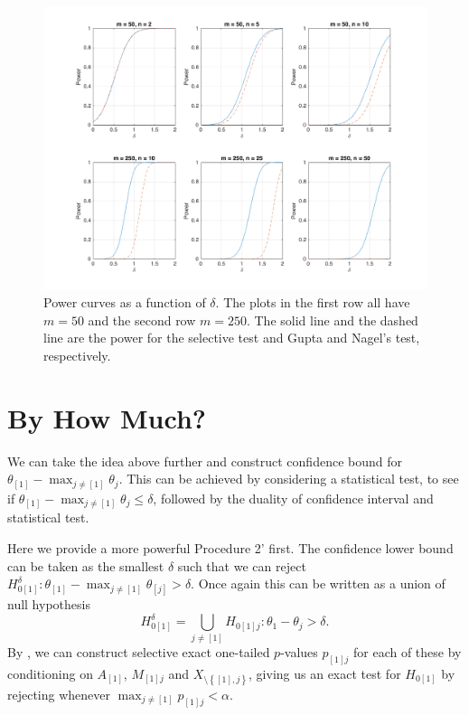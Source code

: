 \documentclass[11pt]{article}
\begin{document}
\begin{figure}[htbp]
\begin{center}
\includegraphics[width = \textwidth]{plotMultinomialPower}
\end{center}
\caption{Power curves as a function of $\delta$. The plots in the first row all have $m = 50$ and the second row $m = 250$. The solid line and the dashed line are the power for the selective test and Gupta and Nagel's test, respectively.}
\label{fig:power}
\end{figure}

\section{By How Much?}
\label{sec:confbound}

We can take the idea above further and construct confidence bound for $\theta_{[1]} - \max_{j \ne [1]} \theta_{j}$. This can be achieved by considering a statistical test, to see if $\theta_{[1]} - \max_{j \ne [1]} \theta_{j} \le \delta$, followed by the duality of confidence interval and statistical test.

Here we provide a more powerful Procedure 2' first. The confidence lower bound can be taken as the smallest $\delta$ such that we can reject $H_{0[1]}^\delta: \theta_{[1]} - \max_{j \ne [1]} \theta_{[j]} > \delta$. Once again this can be written as a union of null hypothesis
$$H_{0[1]}^\delta = \bigcup_{j \ne [1]} H_{0[1]j}: \theta_1 - \theta_j > \delta.$$
By , we can construct selective exact one-tailed $p$-values $p_{[1]j}$ for each of these by conditioning on $A_{[1]}$, $M_{[1]j}$ and $X_{\setminus\left\{[1], j\right\}}$, giving us an exact test for $H_{0[1]}$ by rejecting whenever $\max_{j \ne [1]} p_{[1]j} < \alpha$.
\end{document}
